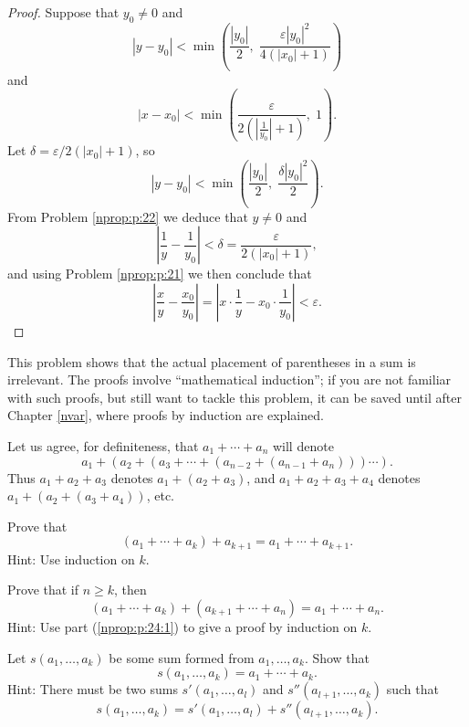 \begin{proof}
	Suppose that $y_0 \neq 0$ and
	$$
		|y - y_0| < \min \left( \frac{|y_0|}{2}, \; \frac{\varepsilon |y_0|^2}{4(|x_0| + 1)} \right)
	$$
	and
	$$
		|x - x_0| < \min \left( \frac{\varepsilon}{2 \left( \left| \frac{1}{y_0} \right| + 1 \right)}, \; 1 \right).
	$$
	Let $\delta = \varepsilon / 2(|x_0| + 1)$, so
	$$
		|y - y_0| < \min \left( \frac{|y_0|}{2}, \; \frac{\delta |y_0|^2}{2} \right).
	$$
	From Problem \ref{nprop:p:22} we deduce that $y \neq 0$ and
	$$
		\left| \frac{1}{y} - \frac{1}{y_0} \right| < \delta = \frac{\varepsilon}{2(|x_0| + 1)},
	$$
	and using Problem \ref{nprop:p:21} we then conclude that
	$$
		\left| \frac{x}{y} - \frac{x_0}{y_0} \right| = \left| x \cdot \frac{1}{y} - x_0 \cdot \frac{1}{y_0} \right| < \varepsilon.
	$$
\end{proof}


\Newpage
\begin{problem} %
	\label{nprop:p:24}

	This problem shows that the actual placement of parentheses in a sum is irrelevant. The proofs involve ``mathematical induction''; if you are not familiar with such proofs, but still want to tackle this problem, it can be saved until after Chapter \ref{nvar}, where proofs by induction are explained.

	Let us agree, for definiteness, that $a_1 + \cdots + a_n$ will denote
	$$
		a_1 + (a_2 + (a_3 + \cdots + (a_{n - 2} + (a_{n - 1} + a_n))) \cdots).
	$$
	Thus $a_1 + a_2 + a_3$ denotes $a_1 + (a_2 + a_3)$, and $a_1 + a_2 + a_3 + a_4$ denotes ${a_1 + (a_2 + (a_3 + a_4))}$, etc.

	\vspace{0.5em}
	\begin{lenumerate}
		\item \label{nprop:p:24:1}
		      Prove that
		      $$
			      (a_1 + \cdots + a_k) + a_{k + 1} = a_1 + \cdots + a_{k + 1}.
		      $$
		      Hint: Use induction on $k$.
		\item \label{nprop:p:24:2}
		      Prove that if $n \geq k$, then
		      $$
			      (a_1 + \cdots + a_k) + (a_{k + 1} + \cdots +a_n) = a_1 + \cdots + a_n.
		      $$
		      Hint: Use part (\ref{nprop:p:24:1}) to give a proof by induction on $k$.
		\item \label{nprop:p:24:3}
		      Let $s(a_1, \ldots, a_k)$ be some sum formed from $a_1, \ldots, a_k$. Show that
		      $$
			      s(a_1, \ldots, a_k) = a_1 + \cdots + a_k.
		      $$
		      Hint: There must be two sums $s'(a_1, \ldots, a_l)$ and $s''(a_{l + 1}, \ldots, a_k)$ such that
		      $$
			      s(a_1, \ldots, a_k) = s'(a_1, \ldots, a_l) + s''(a_{l + 1}, \ldots, a_k).
		      $$
	\end{lenumerate}
\end{problem}

